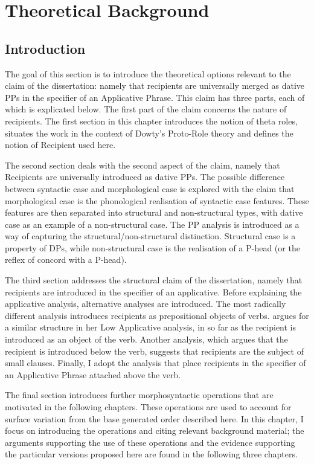 \chapter{Theoretical Background}
\label{ch:theoryback}
\section{Introduction}
The goal of this section is to introduce the theoretical options relevant to the claim of the dissertation: namely that recipients are universally merged as dative PPs in the specifier of an Applicative Phrase. This claim has three parts, each of which is explicated below. The first part of the claim concerns the nature of recipients. The first section in this chapter introduces the notion of theta roles, situates the work in the context of Dowty's Proto-Role theory and defines the notion of Recipient used here.

The second section deals with the second aspect of the claim, namely that Recipients are universally introduced as dative PPs. The possible difference between syntactic case and morphological case is explored with the claim that morphological case is the phonological realisation of syntactic case features. These features are then separated into structural and non-structural types, with dative case as an example of a non-structural case. The PP analysis is introduced as a way of capturing the structural/non-structural distinction. Structural case is a property of DPs, while non-structural case is the realisation of a P-head (or the reflex of concord with a P-head).

The third section addresses the structural claim of the dissertation, namely that recipients are introduced in the specifier of an applicative. Before explaining the applicative analysis, alternative analyses are introduced. The most radically different analysis introduces recipients as prepositional objects of verbs. \cite{Pylkkanen.2001} argues for a similar structure in her Low Applicative analysis, in so far as the recipient is introduced as an object of the verb. Another analysis, which argues that the recipient is introduced below the verb, suggests that recipients are the subject of small clauses. Finally, I adopt the analysis that place recipients in the specifier of an Applicative Phrase attached above the verb.

The final section introduces further morphosyntactic operations that are motivated in the following chapters. These operations are used to account for surface variation from the base generated order described here. In this chapter, I focus on introducing the operations and citing relevant background material; the arguments supporting the use of these operations and the evidence supporting the particular versions proposed here are found in the following three chapters. 

